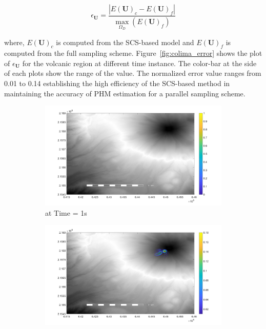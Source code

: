 \begin{equation}
\epsilon_{\textbf{U}} = \frac{|E(\textbf{U})_c - E(\textbf{U})_f|}{\max_{\Omega_{D}} (E(\textbf{U})_f)}
\end{equation}

\noindent where, $E(\textbf{U})_c$ is computed from the SCS-based model and $E(\textbf{U})_f$ is computed from the full sampling scheme. Figure~\ref{fig:colima_error} shows the plot of $\epsilon_{\textbf{U}}$ for the volcanic region at different time instance. The color-bar at the side of each plots show the range of the value. The normalized error value ranges from 0.01 to 0.14 establishing the high efficiency of the SCS-based method in maintaining the accuracy of PHM estimation for a parallel sampling scheme. 


\begin{figure}[H]
\centering
\begin{subfigure}{0.46\textwidth}
\centering
\includegraphics[width=\textwidth]{dem_figs/fig1}
\caption{at Time = 1s}
\end{subfigure}
\begin{subfigure}{0.46\textwidth}
\centering
\includegraphics[width=\textwidth]{dem_figs/fig13}

\end{subfigure}
\end{figure}
